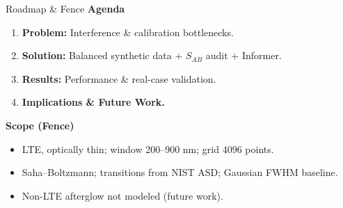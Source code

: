 \documentclass{beamer}
\begin{document}
\begin{frame}{Roadmap \& Fence}
  \textbf{Agenda}
  \begin{enumerate}\setlength{\itemsep}{1pt}
    \item \textbf{Problem:} Interference \& calibration bottlenecks.
    \item \textbf{Solution:} Balanced synthetic data + $S_{AB}$ audit + Informer.
    \item \textbf{Results:} Performance \& real-case validation.
    \item \textbf{Implications \& Future Work.}
  \end{enumerate}
  \vspace{0.4em}
  \textbf{Scope (Fence)}
  \begin{itemize}\setlength{\itemsep}{1pt}
    \item LTE, optically thin; window 200--900 nm; grid 4096 points.
    \item Saha--Boltzmann; transitions from NIST ASD; Gaussian FWHM baseline.
    \item Non-LTE afterglow not modeled (future work).
  \end{itemize}
  \vspace{0.2em}
\end{frame}

\end{document}
